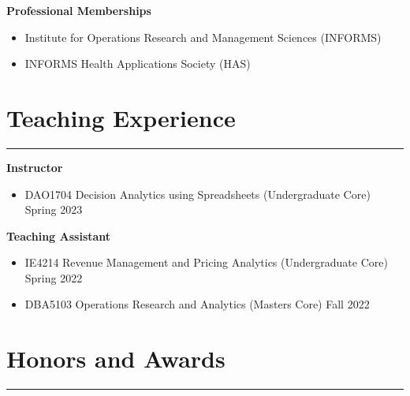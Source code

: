 \documentclass[12pt, a4paper]{article}
\begin{document}
{\raggedright\textbf{Professional Memberships}

\begin{itemize}[leftmargin=26pt, itemsep=2pt, parsep=0pt, topsep=-0.5em]
	\item Institute for Operations Research and Management Sciences (INFORMS)
	\item INFORMS Health Applications Society (HAS)
\end{itemize}




\section*{Teaching Experience}
\vspace*{0.4em}
\hrule height 0.5pt

\raggedright\textbf{Instructor}
\begin{itemize}[leftmargin=26pt, itemsep=2pt, parsep=0pt, topsep=-0.5em]

	\item DAO1704 Decision Analytics using Spreadsheets (Undergraduate Core) \hfill Spring 2023

\end{itemize}

\raggedright\textbf{Teaching Assistant}
\begin{itemize}[leftmargin=26pt, itemsep=2pt, parsep=0pt, topsep=-0.5em]

	\item IE4214 Revenue Management and Pricing Analytics (Undergraduate Core) \hfill Spring 2022

	\item DBA5103 Operations Research and Analytics (Masters Core) \hfill Fall 2022

\end{itemize}




\section*{Honors and Awards}
\vspace*{0.4em}
\hrule height 0.5pt
\begin{itemize}[leftmargin=26pt, itemsep=1pt, parsep=0.5pt, topsep=1pt]


\end{itemize}}
\end{document}
